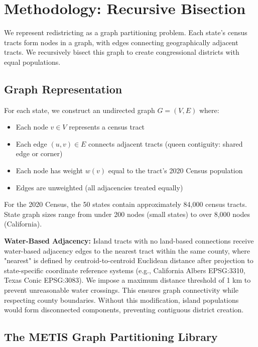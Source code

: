 \section{Methodology: Recursive Bisection}
\label{sec:methodology}

We represent redistricting as a graph partitioning problem. Each state's census tracts form nodes in a graph, with edges connecting geographically adjacent tracts. We recursively bisect this graph to create congressional districts with equal populations.

\subsection{Graph Representation}

For each state, we construct an undirected graph $G = (V, E)$ where:
\begin{itemize}
    \item Each node $v \in V$ represents a census tract
    \item Each edge $(u, v) \in E$ connects adjacent tracts (queen contiguity: shared edge or corner)
    \item Each node has weight $w(v)$ equal to the tract's 2020 Census population \cite{census2020redistricting}
    \item Edges are unweighted (all adjacencies treated equally)
\end{itemize}

For the 2020 Census, the 50 states contain approximately 84,000 census tracts. State graph sizes range from under 200 nodes (small states) to over 8,000 nodes (California).

\textbf{Water-Based Adjacency:} Island tracts with no land-based connections receive water-based adjacency edges to the nearest tract within the same county, where "nearest" is defined by centroid-to-centroid Euclidean distance after projection to state-specific coordinate reference systems (e.g., California Albers EPSG:3310, Texas Conic EPSG:3083). We impose a maximum distance threshold of 1 km to prevent unreasonable water crossings. This ensures graph connectivity while respecting county boundaries. Without this modification, island populations would form disconnected components, preventing contiguous district creation.

\subsection{The METIS Graph Partitioning Library}

